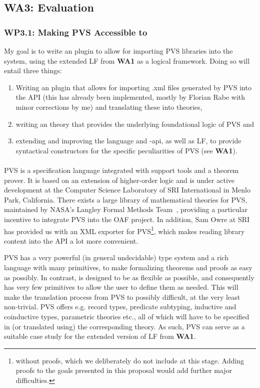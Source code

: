 \subsection{\textbf{WA3}: Evaluation}

\subsubsection{\textbf{WP3.1}: Making PVS Accessible to \mmt}\label{sec:integrating}\label{sec:PVS}

My goal is to write an \mmt plugin to allow for importing PVS libraries into the \mmt system, using the extended LF from \textbf{WA1} as a logical framework.
Doing so will entail three things:
\begin{enumerate}
	\item Writing an \mmt plugin that allows for importing .xml files generated by PVS
		 into the \mmt API (this has already been implemented, mostly by Florian Rabe with minor corrections 
		 by me) and translating these into \mmt theories,
	\item writing an \mmt theory that provides the underlying foundational logic of PVS and
	\item extending and improving the \mmt language and -api, as well as LF, to provide syntactical constructors 
		for the specific peculiarities of PVS (see \textbf{WA1}).
\end{enumerate}

\paragraph{} PVS \cite{pvs} is a specification language integrated with support tools and a theorem prover. It is based on an extension of higher-order logic and is under active development at the Computer Science Laboratory of SRI International in Menlo Park, California. There exists a large library of mathematical theories for PVS, maintained by NASA's Langley Formal Methods Team~\cite{PVSlibraries:on}, providing a particular incentive to integrate PVS into the OAF project. In addition, Sam Owre at SRI has provided us with an XML exporter for PVS\footnote{without proofs, which we deliberately do not include at this stage. Adding proofs to the goals presented in this proposal would add further major difficulties.}, which makes reading library content into the \mmt API a lot more convenient.

PVS has a very powerful (in general undecidable) type system and a rich language with many pri\-mi\-tives, to make formalizing theorems and proofs as easy as possibly. In contrast, \mmt is designed to be as flexible as possible, and consequently has very few primitives to allow the user to define them as needed. This will make the translation process from PVS to \mmt possibly difficult, at the very least non-trivial. PVS offers e.g. record types,
predicate subtyping, inductive and coinductive types, parametric theories etc., all of which will have to be specified in (or translated using) the corresponding \mmt theory. As such, PVS can serve as a suitable case study for the extended version of LF from \textbf{WA1}.

